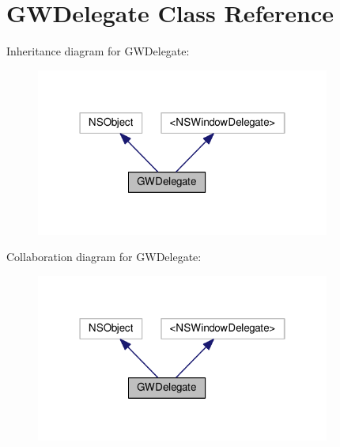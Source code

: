 \hypertarget{interfaceGWDelegate}{}\section{G\+W\+Delegate Class Reference}
\label{interfaceGWDelegate}


Inheritance diagram for G\+W\+Delegate\+:
\nopagebreak
\begin{figure}[H]
\begin{center}
\leavevmode
\includegraphics[width=274pt]{interfaceGWDelegate__inherit__graph}
\end{center}
\end{figure}


Collaboration diagram for G\+W\+Delegate\+:
\nopagebreak
\begin{figure}[H]
\begin{center}
\leavevmode
\includegraphics[width=274pt]{interfaceGWDelegate__coll__graph}
\end{center}
\end{figure}
